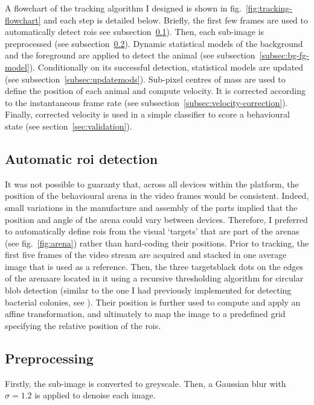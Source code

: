 A flowchart of the tracking algorithm I designed is shown in fig.~\ref{fig:tracking-flowchart} and each step is detailed below.
Briefly, the first few frames are used to automatically detect \glspl{roi} see subsection~\ref{subsec:auto-roi}).
Then, each sub-image is preprocessed (see subsection~\ref{subsec:preprocessing}).
Dynamic statistical models of the background and the foreground are applied to detect the animal (see subsection~\ref{subsec:bg-fg-model}).
Conditionally on its successful detection, statistical models are updated (see subsection~\ref{subsec:updatemods}).
Sub-pixel centres of mass are used to define the position of each animal and compute velocity.
It is corrected according to the instantaneous frame rate (see subsection~\ref{subsec:velocity-correction}).
Finally, corrected velocity is used in a simple classifier to score a behavioural state (see section~\ref{sec:validation}).


\subsection{Automatic \gls{roi} detection}
\label{subsec:auto-roi}

It was not possible to guaranty that, across all devices within the platform, the position of the behavioural arena in the video frames would be consistent. 
Indeed, small variations in the manufacture and assembly of the parts implied that the position and angle of the arena could vary between devices.
Therefore, I preferred to automatically define \glspl{roi} from the visual `targets' that are part of the arenas (see fig.~\ref{fig:arena}) rather than hard-coding their positions.
Prior to tracking, the first five frames of the video stream are acquired and stacked in one average image that is used as a reference.
Then, the three targets\emd{}black dots on the edges of the arena\emd{}are located in it using a recursive thresholding algorithm for circular blob detection (similar to the one I had previously implemented for detecting bacterial colonies, see \cite{geissmann_opencfu_2013}).
Their position is further used to compute and apply an affine transformation, and ultimately to map the image to a predefined grid specifying the relative position of the \glspl{roi}.

\subsection{Preprocessing}
\label{subsec:preprocessing}
Firstly, the sub-image is converted to greyscale. 
Then, a Gaussian blur with $\sigma=1.2$  is applied to denoise each image.

